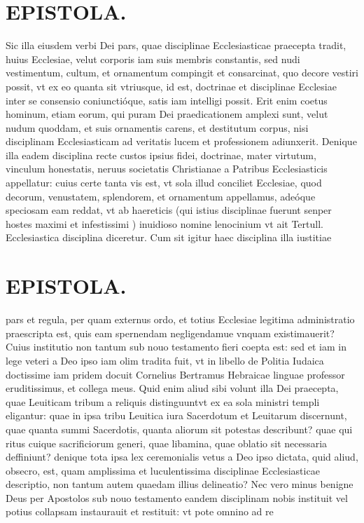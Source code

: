 \documentclass{article}
\begin{document}
\begin{pages}
\section*{EPISTOLA. }\pstart Sic illa eiusdem verbi Dei pars, quae disciplinae Ecclesiasticae praecepta tradit, huius Ecclesiae, velut corporis iam suis membris constantis, sed nudi vestimentum, cultum, et ornamentum compingit et consarcinat, quo decore vestiri possit, vt ex eo quanta sit vtriusque, id est, doctrinae et disciplinae Ecclesiae inter se consensio coniunctióque, satis iam intelligi possit. Erit enim coetus hominum, etiam eorum, qui puram Dei praedicationem amplexi sunt, velut nudum quoddam, et suis ornamentis carens, et destitutum corpus, nisi disciplinam Ecclesiasticam ad veritatis lucem et professionem adiunxerit. Denique illa eadem disciplina recte custos ipsius fidei, doctrinae, mater virtutum, vinculum honestatis, neruus societatis Christianae a Patribus Ecclesiasticis appellatur: cuius certe tanta vis est, vt sola illud conciliet Ecclesiae, quod decorum, venustatem, splendorem, et ornamentum appellamus, adeóque speciosam eam reddat, vt ab haereticis (qui istius disciplinae fuerunt senper hostes maximi et infestissimi ) inuidioso nomine lenocinium vt ait Tertull. Ecclesiastica disciplina diceretur. Cum sit igitur haec disciplina illa iustitiae  \pend
\section*{EPISTOLA. }\pstart pars et regula, per quam externus ordo, et totius Ecclesiae legitima administratio praescripta est, quis eam spernendam negligendamue vnquam existimauerit? Cuius institutio non tantum sub nouo testamento fieri coepta est: sed et iam in lege veteri a Deo ipso iam olim tradita fuit, vt in libello de Politia Iudaica doctissime iam pridem docuit Cornelius Bertramus Hebraicae linguae professor eruditissimus, et collega meus. Quid enim aliud sibi volunt illa Dei praecepta, quae Leuiticam tribum a reliquis distinguuntvt ex ea sola ministri templi eligantur: quae in ipsa tribu Leuitica iura Sacerdotum et Leuitarum discernunt, quae quanta summi Sacerdotis, quanta aliorum sit potestas describunt? quae qui ritus cuique sacrificiorum generi, quae libamina, quae oblatio sit necessaria deffiniunt? denique tota ipsa lex ceremonialis vetus a Deo ipso dictata, quid aliud, obsecro, est, quam amplissima et luculentissima disciplinae Ecclesiasticae descriptio, non tantum autem quaedam illius delineatio? Nec vero minus benigne Deus per Apostolos sub nouo testamento eandem disciplinam nobis instituit vel potius collapsam instaurauit et restituit: vt pote omnino ad re\pend

\end{pages}
\end{document}
